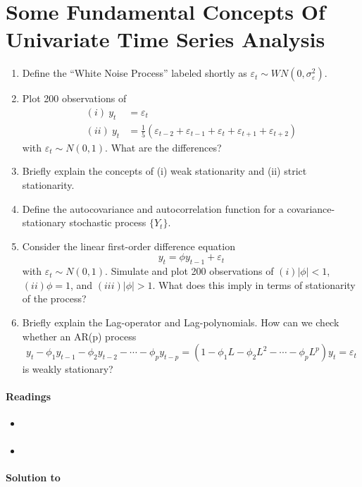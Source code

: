 \section[Some Fundamental Concepts Of Univariate Time Series Analysis]{Some Fundamental Concepts Of Univariate Time Series Analysis\label{ex:FundamentalConceptsUnivariateTimeSeriesAnalysis}}

\begin{enumerate}
\item Define the \enquote{White Noise Process} labeled shortly as \(\varepsilon_t \sim WN(0,\sigma_\varepsilon^2)\).
\item Plot 200 observations of 
\begin{align*} 
(i)~y_t  &= \varepsilon_t
\\
(ii)~y_t &= \frac{1}{5}(\varepsilon_{t-2}+\varepsilon_{t-1}+\varepsilon_{t}+\varepsilon_{t+1}+\varepsilon_{t+2})
\end{align*} 
with \(\varepsilon_{t} \sim N(0,1)\). What are the differences?	
\item Briefly explain the concepts of (i) weak stationarity and (ii) strict stationarity.
\item Define the autocovariance and autocorrelation function for a covariance-stationary stochastic process \( \{Y_t\} \).
\item Consider the linear first-order difference equation
\[y_t=\phi y_{t-1}+\varepsilon_t\]
  with \(\varepsilon_{t} \sim N(0,1)\).
Simulate and plot 200 observations of \((i) |\phi|<1\), \((ii) \phi=1\), and \((iii) |\phi| >1\).
What does this imply in terms of stationarity of the process?
\item Briefly explain the Lag-operator and Lag-polynomials.
How can we check whether an {AR{(p)}} process
\[y_t - \phi_1 y_{t-1} -\phi_2 y_{t-2} - \cdots  - \phi_p y_{t-p} = (1-\phi_1 L-\phi_2 L^2 -\cdots  - \phi_p L^p)y_t = \varepsilon_t\]
is weakly stationary?
\end{enumerate}

\paragraph{Readings}
\begin{itemize}
\item \textcite[Ch.2]{Bjornland.Thorsrud_2015_AppliedTimeSeries}
\item \textcite{Lutkepohl_2004_UnivariateTimeSeries}
\end{itemize}

\begin{solution}\textbf{Solution to }
\ifDisplaySolutions%

\fi
\newpage
\end{solution}